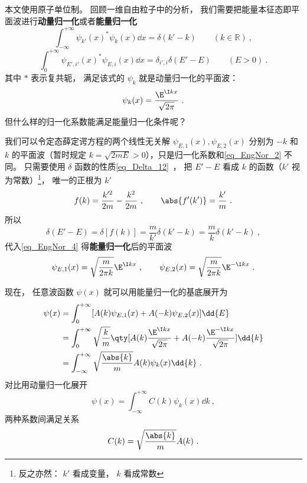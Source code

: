 

本文使用原子单位制。 回顾一维自由粒子中的分析， 我们需要把能量本征态即平面波进行\textbf{动量归一化}或者\textbf{能量归一化}%
\begin{equation}\label{eq_EngNor_1}
\int_{-\infty}^{+\infty} \psi_{k'}(x)^* \psi_{k}(x) \dd{x} = \delta(k' - k) \qquad (k \in \mathbb R)~,
\end{equation}
\begin{equation}\label{eq_EngNor_4}
\int_{0}^{+\infty} \psi_{E',i'}(x)^* \psi_{E,i}(x) \dd{x} = \delta_{i',i}\delta(E' - E) \qquad (E > 0)~.
\end{equation}
其中 $*$ 表示复共轭， 满足该式的 $\psi_k$ 就是动量归一化的平面波：%
\begin{equation}\label{eq_EngNor_2}
\psi_k(x) = \frac{\E^{\I kx}}{\sqrt{2\pi}}~.
\end{equation}
但什么样的归一化系数能满足能量归一化条件呢？

我们可以令定态薛定谔方程的两个线性无关解 $\psi_{E,1}(x), \psi_{E,2}(x)$ 分别为 $-k$ 和 $k$ 的平面波（暂时规定 $k = \sqrt{2mE} > 0$），只是归一化系数和\autoref{eq_EngNor_2} 不同。 只需要使用 $\delta$ 函数的性质\autoref{eq_Delta_12}~， 把 $E'-E$ 看成 $k$ 的函数（$k'$ 视为常数）\footnote{反之亦然： $k'$ 看成变量， $k$ 看成常数}， 唯一的正根为 $k'$
\begin{equation}
f(k) = \frac{k'^2}{2m} - \frac{k^2}{2m}~,
\qquad
\abs{f'(k')} = \frac{k'}{m}~.
\end{equation}
所以
\begin{equation}
\delta(E'-E) = \delta[f(k)] = \frac{m}{k'} \delta(k'-k) = \frac{m}{k} \delta(k'-k)~,
\end{equation}
代入\autoref{eq_EngNor_4} 得\textbf{能量归一化}后的平面波
\begin{equation}
\psi_{E,1}(x) = \sqrt{\frac{m}{2\pi k}}\E^{\I kx}~,
\qquad
\psi_{E,2}(x) = \sqrt{\frac{m}{2\pi k}}\E^{-\I kx}~.
\end{equation}

现在， 任意波函数 $\psi(x)$ 就可以用能量归一化的基底展开为%
\begin{equation}
\begin{aligned}
\psi(x) &= \int_0^{+\infty} [A(k) \psi_{E,1}(x) + A(-k) \psi_{E,2}(x)] \dd{E}\\
&= \int_0^{+\infty} \sqrt{\frac{k}{m}}\qty[A(k) \frac{\E^{\I kx}}{\sqrt{2\pi}} + A(-k)\frac{\E^{-\I kx}}{\sqrt{2\pi}}]\dd{k}\\
&= \int_{-\infty}^{+\infty} \sqrt{\frac{\abs{k}}{m}}A(k) \psi_k(x) \dd{k}~.
\end{aligned}
\end{equation}
对比用动量归一化展开
\begin{equation}
\psi(x) = \int_{-\infty}^{+\infty} C(k)\psi_k(x) \dd{k}~,
\end{equation}
两种系数间满足关系
\begin{equation}
C(k) = \sqrt{\frac{\abs{k}}{m}}A(k)~.
\end{equation}

